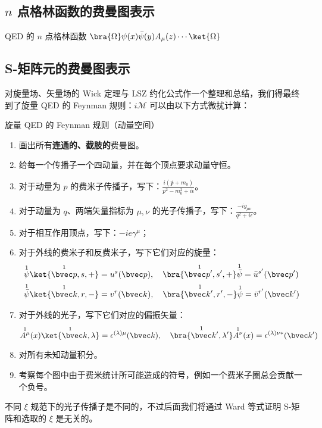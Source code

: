 
\subsection{$n$ 点格林函数的费曼图表示}
QED 的 $n$ 点格林函数 $\bra{\Omega} \psi(x)\bar\psi(y)A_\mu(z) \cdots \ket{\Omega}$ 

\subsection{S-矩阵元的费曼图表示}

对旋量场、矢量场的 Wick 定理与 LSZ 约化公式作一个整理和总结，我们得最终到了旋量 QED 的 Feynman 规则：$i\mathcal{M}$ 可以由以下方式微扰计算：
\begin{theorem}{旋量 QED 的 Feynman 规则（动量空间）}

\begin{enumerate}
\item 画出所有\textbf{连通的、截肢的}费曼图。
\item 给每一个传播子一个四动量，并在每个顶点要求动量守恒。
\item 对于动量为 $p$ 的费米子传播子，写下：$\frac{i(\not p+m_0)}{p^2-m_0^2 + i\epsilon}$。
\item 对于动量为 $q$、两端矢量指标为 $\mu,\nu$ 的光子传播子，写下：$\frac{-ig_{\mu\nu}}{q^2 + i\epsilon}$。
\item 对于相互作用顶点，写下：$-ie\gamma^\mu$；
\item 对于外线的费米子和反费米子，写下它们对应的旋量：
\begin{align*}
&\overset{1}{\psi}\overset{1}{\ket{\bvec p,s,+}}=u^s(\bvec p),\quad \overset{1}{\bra{\bvec p',s',+}} \overset{1}{\bar\psi}=\bar u^{s'}(\bvec p')\\
&\overset{1}{\bar\psi}\overset{1}{\ket{\bvec k,r,-}}=v^{r}(\bvec k),\quad \overset{1}{\bra{\bvec k',r',-}} \overset{1}{\psi}=\bar v^{r'}(\bvec k')
\end{align*}
\item 对于外线的光子，写下它们对应的偏振矢量：
\[
\overset{1}{A^\mu}(x) \overset{1}{\ket{\bvec k,\lambda}}=\epsilon^{(\lambda)\mu}(\bvec k),\quad \overset{1}{\bra{\bvec k',\lambda'}}\overset{1}{A^\nu}(x)=\epsilon^{(\lambda)\nu*}(\bvec k')
\]
\item 
对所有未知动量积分。
\item 
考察每个图中由于费米统计所可能造成的符号，例如一个费米子圈总会贡献一个负号。
\end{enumerate}
\end{theorem}
不同 $\xi$ 规范下的光子传播子是不同的，不过后面我们将通过 Ward 等式证明 S-矩阵和选取的 $\xi$ 是无关的。
